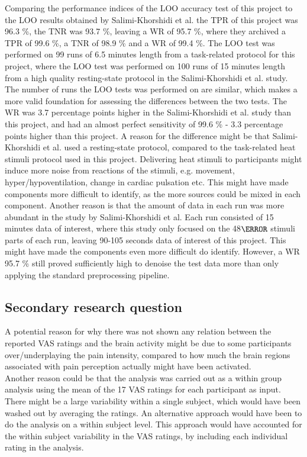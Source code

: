 Comparing the performance indices of the LOO accuracy test of this project to the LOO results obtained by Salimi-Khorshidi et al. \cite{Salimi-Khorshidi2014} the TPR of this project was 96.3 \%, the TNR was 93.7 \%, leaving a  WR of 95.7 \%, where they archived a TPR of 99.6 \%, a TNR of 98.9 \% and a WR of 99.4 \%. The LOO test was performed on 99 runs of 6.5 minutes length from a task-related protocol for this project, where the LOO test was performed on 100 runs of 15 minutes length from a high quality resting-state protocol in the Salimi-Khorshidi et al. study. The number of runs the LOO tests was performed on are similar, which makes a more valid foundation for assessing the differences between the two tests. 
The WR was 3.7 percentage points higher in the Salimi-Khorshidi et al. study than this project, and had an almost perfect sensitivity of 99.6 \% - 3.3 percentage points higher than this project. A reason for the difference might be that Salimi-Khorshidi et al. used a resting-state protocol, compared to the task-related heat stimuli protocol used in this project. Delivering heat stimuli to participants might induce more noise from reactions of the stimuli, e.g. movement, hyper/hypoventilation, change in cardiac pulsation etc. This might have made components more difficult to identify, as the more sources could be mixed in each component. Another reason is that the amount of data in each run was more abundant in the study by Salimi-Khorshidi et al. Each run consisted of 15 minutes data of interest, where this study only focused on the 48$\degree$ stimuli parts of each run, leaving 90-105 seconds data of interest of this project. This might have made the components even more difficult do identify. However, a WR 95.7 \% still proved sufficiently high to denoise the test data more than only applying the standard preprocessing pipeline. 

\subsection*{Secondary research question}
A potential reason for why there was not shown any relation between the reported VAS ratings and the brain activity might be due to some participants over/underplaying the pain intensity, compared to how much the brain regions associated with pain perception actually might have been activated. \\
Another reason could be that the analysis was carried out as a within group analysis using the mean of the 17 VAS ratings for each participant as input. There might be a large variability within a single subject, which would have been washed out by averaging the ratings. An alternative approach would have been to do the analysis on a within subject level. This approach would have accounted for the within subject variability in the VAS ratings, by including each individual rating in the analysis.
